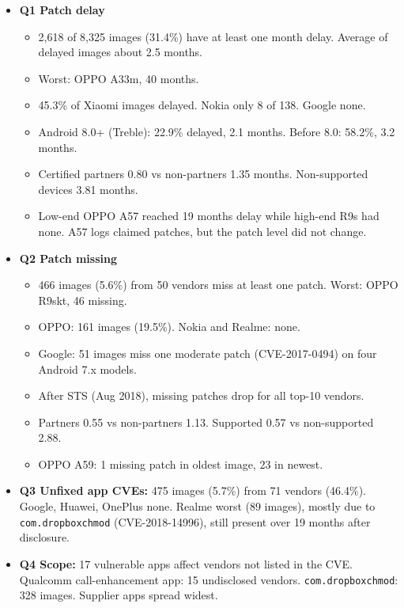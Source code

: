 \documentclass[11pt,a4paper]{article}
\begin{document}
\begin{enumerate}
    \begin{itemize}
        \item \textbf{Q1 Patch delay}
        \begin{itemize}
            \item 2,618 of 8,325 images (31.4\%) have at least one month delay. Average of delayed images about 2.5 months.
            \item Worst: OPPO A33m, 40 months.
            \item 45.3\% of Xiaomi images delayed. Nokia only 8 of 138. Google none.
            \item Android 8.0+ (Treble): 22.9\% delayed, 2.1 months. Before 8.0: 58.2\%, 3.2 months.
            \item Certified partners 0.80 vs non-partners 1.35 months. Non-supported devices 3.81 months.
            \item Low-end OPPO A57 reached 19 months delay while high-end R9s had none. A57 logs claimed patches, but the patch level did not change.
        \end{itemize}
        \item \textbf{Q2 Patch missing}
        \begin{itemize}
            \item 466 images (5.6\%) from 50 vendors miss at least one patch. Worst: OPPO R9skt, 46 missing.
            \item OPPO: 161 images (19.5\%). Nokia and Realme: none.
            \item Google: 51 images miss one moderate patch (CVE-2017-0494) on four Android 7.x models.
            \item After STS (Aug 2018), missing patches drop for all top-10 vendors.
            \item Partners 0.55 vs non-partners 1.13. Supported 0.57 vs non-supported 2.88.
            \item OPPO A59: 1 missing patch in oldest image, 23 in newest.
        \end{itemize}
        \item \textbf{Q3 Unfixed app CVEs:} 475 images (5.7\%) from 71 vendors (46.4\%). Google, Huawei, OnePlus none. Realme worst (89 images), mostly due to \texttt{com.dropboxchmod} (CVE-2018-14996), still present over 19 months after disclosure.
        \item \textbf{Q4 Scope:} 17 vulnerable apps affect vendors not listed in the CVE. Qualcomm call-enhancement app: 15 undisclosed vendors. \texttt{com.dropboxchmod}: 328 images. Supplier apps spread widest.

\end{itemize}
\end{enumerate}
\end{document}
